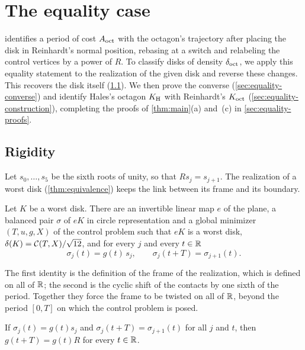 \section{The equality case}\label{sec:equality}

 identifies a period of cost $A_{\mathrm{oct}}$ with the octagon's trajectory
after placing the disk in Reinhardt's normal position, rebasing at a switch and relabeling the
control vertices by a power of $R$. To classify disks of density $\delta_{\mathrm{oct}}$, we apply this equality statement to the
realization of the given disk and reverse these changes. This recovers the disk itself
(\cref{sec:equality-rigidity}). We then prove the converse (\cref{sec:equality-converse}) and
identify Hales's octagon $K_{\mathrm{H}}$ with Reinhardt's $K_{\mathrm{oct}}$ (\cref{sec:equality-construction}),
completing the proofs of \cref{thm:main}(a) and~(c) in \cref{sec:equality-proofs}.

\subsection{Rigidity}\label{sec:equality-rigidity}

Let $s_0,\dots,s_5$ be the sixth roots of unity, so that $Rs_j=s_{j+1}$. The realization of a worst
disk (\cref{thm:equivalence}) keeps the link between its frame and its boundary.

\begin{lemma}\label{lem:eq-realization}
Let $K$ be a worst disk. There are an invertible linear map $e$ of the plane, a balanced pair
$\sigma$ of $eK$ in circle representation and a global minimizer $(T,u,g,X)$ of the control
problem such that $eK$ is a worst disk, $\delta(K)=\mathcal{C}(T,X)/\sqrt{12}$, and for every $j$ and
every $t\in\mathbb{R}$
\[
 \sigma_j(t)=g(t)\,s_j,\qquad \sigma_j(t+T)=\sigma_{j+1}(t).
\]
\end{lemma}

The first identity is the definition of the frame of the realization, which is defined on all
of $\mathbb{R}$; the second is the cyclic shift of the contacts by one sixth of the period. Together they
force the frame to be twisted on all of $\mathbb{R}$, beyond the period $[0,T]$ on which the control
problem is posed.

\begin{lemma}\label{lem:eq-frame-twist}
If $\sigma_j(t)=g(t)s_j$ and $\sigma_j(t+T)=\sigma_{j+1}(t)$ for all $j$ and $t$, then
$g(t+T)=g(t)R$ for every $t\in\mathbb{R}$.
\end{lemma}

